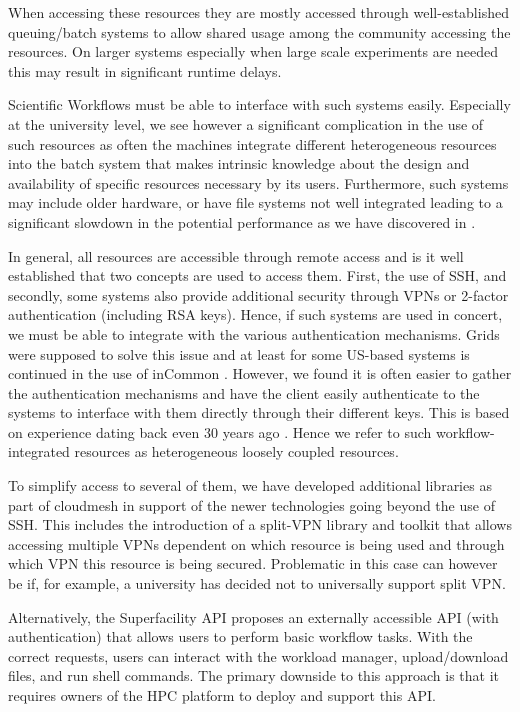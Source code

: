 \documentclass[utf8]{FrontiersinVancouver} %
\begin{document}
When accessing these resources they are mostly accessed through well-established queuing/batch systems to allow shared usage among the community accessing the resources. On larger systems especially when large scale experiments are needed this may result in significant runtime delays.

Scientific Workflows must be able to interface with such systems easily. Especially at the university level, we see however a significant complication in the use of such resources as often the machines integrate different heterogeneous resources into the batch system that makes intrinsic knowledge about the design and availability of specific resources necessary by its users. Furthermore, such systems may include older hardware, or have file systems not well integrated leading to a significant slowdown in the potential performance as we have discovered in \citep{las-frontiers-edu}. 

In general, all resources are accessible through remote access and is it well established that two concepts are used to access them. First, the use of SSH, and secondly, some systems also provide additional security through VPNs or 2-factor authentication (including RSA keys). Hence, if such systems are used in concert, we must be able to integrate with the various authentication mechanisms. Grids were supposed to solve this issue and at least for some US-based systems is continued in the use of inCommon \citep{incommon}. However, we found it is often easier to gather the authentication mechanisms and have the client easily authenticate to the systems to interface with them directly through their different keys. This is based on experience dating back even 30 years ago \cite{las-99-loosely}. Hence we refer to such workflow-integrated resources as heterogeneous loosely coupled resources.

To simplify access to several of them, we have developed additional libraries as part of cloudmesh in
support of the newer technologies going beyond the use of SSH. This includes the introduction of a split-VPN library and toolkit that allows accessing multiple VPNs dependent on which resource is being used and through which VPN this resource is being secured. Problematic in this case can however be if, for example, a university has decided not to universally support split VPN.

Alternatively, the Superfacility API \citep{Enders2020} proposes an externally accessible API (with authentication) that allows users to perform basic workflow tasks. With the correct requests, users can interact with the workload manager, upload/download files, and run shell commands. The primary downside to this approach is that it requires owners of the HPC platform to deploy and support this API.
\end{document}
